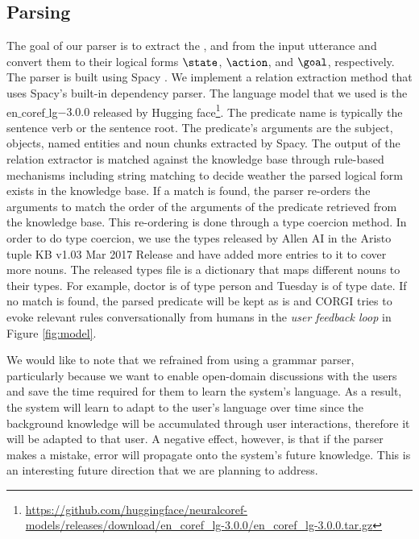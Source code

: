 


\subsection*{Parsing}
The goal of our parser is to extract the \textState, \textAction and \textGoal from the input utterance and convert them to their logical forms $\state$, $\action$, and $\goal$, respectively. The parser is built using Spacy \cite{honnibal2017spacy}. We implement a relation extraction method that uses Spacy's built-in dependency parser. The language model that we used is the en$\_$coref$\_$lg$-3.0.0$ released by Hugging face\footnote{\url{https://github.com/huggingface/neuralcoref-models/releases/download/en_coref_lg-3.0.0/en_coref_lg-3.0.0.tar.gz}}. %
The predicate name is typically the sentence verb or the sentence root. The predicate's arguments are the subject, objects, named entities and noun chunks extracted by Spacy. The output of the relation extractor is matched against the knowledge base through rule-based mechanisms including string matching to decide weather the parsed logical form exists in the knowledge base. 
If a match is found, the parser re-orders the arguments to match the order of the arguments of the predicate retrieved from the knowledge base. This re-ordering is done through a type coercion method. In order to do type coercion, we use the types released by Allen AI in the Aristo tuple KB v1.03 Mar 2017 Release \cite{dalvi2017domain} and have added more entries to it to cover more nouns. %
The released types file is a dictionary that maps different nouns to their types. For example, doctor is of type person and Tuesday is of type date. If no match is found, the parsed predicate will be kept as is and CORGI tries to evoke relevant rules conversationally from humans in the \emph{user feedback loop} in Figure \ref{fig:model}.

We would like to note that we refrained from using a grammar parser, particularly because we want to enable open-domain discussions with the users and save the time required for them to learn the system's language. As a result, the system will learn to adapt to the user's language over time since the background knowledge will be accumulated through user interactions, therefore it will be adapted to that user. A negative effect, however, is that if the parser makes a mistake, error will propagate onto the system's future knowledge. This is an interesting future direction that we are planning to address. %

